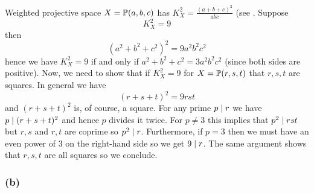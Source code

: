 \documentclass[12pt]{article}
\begin{document}
Weighted projective space $X = \P(a,b,c)$ has $K_X^2 = \frac{(a+b+c)^2}{abc}$ (see . Suppose
\[ K_X^2 = 9 \]
then 
\[ (a^2 + b^2 + c^2)^2 = 9 a^2b^2c^2 \]
hence we have $K_X^2 = 9$ if and only if $a^2 + b^2 + c^2 = 3 a^2 b^2 c^2$ (since both sides are positive). Now, we need to show that if $K_X^2 = 9$ for $X = \P(r,s,t)$ that $r,s,t$ are squares. In general we have
\[ (r + s + t)^2 = 9 r s t \]
and $(r + s + t)^2$ is, of course, a square. For any prime $p \divides r$ we have $p \divides (r + s + t)^2$ and hence $p$ divides it twice. For $p \neq 3$ this implies that $p^2 \divides rst$ but $r,s$ and $r,t$ are coprime so $p^2 \divides r$. Furthermore, if $p = 3$ then we must have an even power of $3$ on the right-hand side so we get $9 \divides r$. The same argument shows that $r,s,t$ are all squares so we conclude.

\subsubsection{(b)}

\newcommand{\ob}{\mathrm{ob}}
\newcommand{\Def}{\mathrm{Def}}
\renewcommand{\X}{\mathcal{X}}
\end{document}
